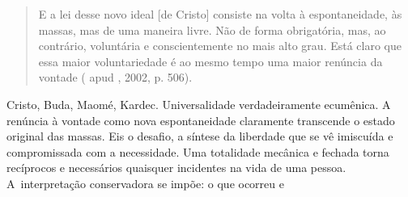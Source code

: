 \begin{quote}
E a lei desse novo ideal {[}de Cristo{]} consiste na volta à
espontaneidade, às massas, mas de uma maneira livre. Não de forma
obrigatória, mas, ao contrário, voluntária e conscientemente no mais
alto grau. Está claro que essa maior voluntariedade é ao mesmo tempo uma
maior renúncia da vontade ( apud , 2002, p. 506).
\end{quote}

Cristo, Buda, Maomé, Kardec. Universalidade verdadeiramente ecumênica. A
renúncia à vontade como nova espontaneidade claramente transcende o
estado original das massas. Eis o desafio, a síntese da liberdade que se
vê imiscuída e compromissada com a necessidade. Uma totalidade mecânica
e fechada torna recíprocos e necessários quaisquer incidentes na vida de
uma pessoa. A~interpretação conservadora se impõe: o que ocorreu e
